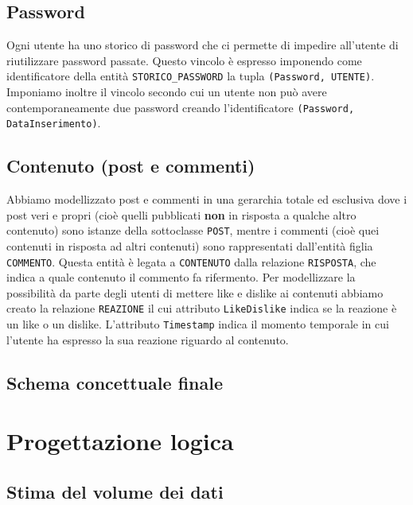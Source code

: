 \documentclass[a4paper,12pt]{report}
\begin{document}
\section{Password}
Ogni utente ha uno storico di password che ci permette di impedire all'utente di riutilizzare password passate. Questo vincolo è espresso imponendo come identificatore della entità \texttt{STORICO\_PASSWORD} la tupla \texttt{(Password, UTENTE)}. Imponiamo inoltre il vincolo secondo cui un utente non può avere contemporaneamente due password creando l'identificatore \texttt{(Password, DataInserimento)}.

\section{Contenuto (post e commenti)}
Abbiamo modellizzato post e commenti in una gerarchia totale ed esclusiva dove i post veri e propri (cioè quelli pubblicati \textbf{non} in risposta a qualche altro contenuto) sono istanze della sottoclasse \texttt{POST}, mentre i commenti (cioè quei contenuti in risposta ad altri contenuti) sono rappresentati dall'entità figlia \texttt{COMMENTO}. Questa entità è legata a \texttt{CONTENUTO} dalla relazione \texttt{RISPOSTA}, che indica a quale contenuto il commento fa rifermento.
Per modellizzare la possibilità da parte degli utenti di mettere like e dislike ai contenuti abbiamo creato la relazione \texttt{REAZIONE} il cui attributo \texttt{LikeDislike} indica se la reazione è un like o un dislike. L'attributo \texttt{Timestamp} indica il momento temporale in cui l'utente ha espresso la sua reazione riguardo al contenuto. 

\section{Schema concettuale finale}
\chapter{Progettazione logica}
\section{Stima del volume dei dati}
\end{document}
